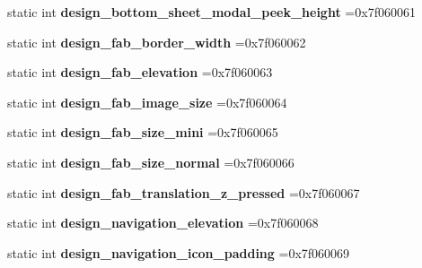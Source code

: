 \begin{DoxyCompactItemize}
static int {\bfseries design\+\_\+bottom\+\_\+sheet\+\_\+modal\+\_\+peek\+\_\+height} =0x7f060061
\item 
\mbox{\label{classandroid_1_1support_1_1v4_1_1R_1_1dimen_a17b7598d0c2f1290af82611b02b2026e}} 
static int {\bfseries design\+\_\+fab\+\_\+border\+\_\+width} =0x7f060062
\item 
\mbox{\label{classandroid_1_1support_1_1v4_1_1R_1_1dimen_a8e422744b0bf5a32a818ddc254a1f177}} 
static int {\bfseries design\+\_\+fab\+\_\+elevation} =0x7f060063
\item 
\mbox{\label{classandroid_1_1support_1_1v4_1_1R_1_1dimen_a13d782e0e6d471f9c773e20f51aa7722}} 
static int {\bfseries design\+\_\+fab\+\_\+image\+\_\+size} =0x7f060064
\item 
\mbox{\label{classandroid_1_1support_1_1v4_1_1R_1_1dimen_acfb557e2c0a7015f6983f1cbd72d1b4e}} 
static int {\bfseries design\+\_\+fab\+\_\+size\+\_\+mini} =0x7f060065
\item 
\mbox{\label{classandroid_1_1support_1_1v4_1_1R_1_1dimen_ab9662a50cfed9b3d4a34699d3ab239fd}} 
static int {\bfseries design\+\_\+fab\+\_\+size\+\_\+normal} =0x7f060066
\item 
\mbox{\label{classandroid_1_1support_1_1v4_1_1R_1_1dimen_ad37dd439e1f02e022ffa7c4c7bca4188}} 
static int {\bfseries design\+\_\+fab\+\_\+translation\+\_\+z\+\_\+pressed} =0x7f060067
\item 
\mbox{\label{classandroid_1_1support_1_1v4_1_1R_1_1dimen_aff5da0d34d4d8804ed577656899b1489}} 
static int {\bfseries design\+\_\+navigation\+\_\+elevation} =0x7f060068
\item 
\mbox{\label{classandroid_1_1support_1_1v4_1_1R_1_1dimen_a6ef7a8f45e4d2e372168d9e749708e80}} 
static int {\bfseries design\+\_\+navigation\+\_\+icon\+\_\+padding} =0x7f060069
\item 
\mbox{\label{classandroid_1_1support_1_1v4_1_1R_1_1dimen_afa90a96629eef5a94ee5d1df92670a9a}} 

\end{DoxyCompactItemize}
